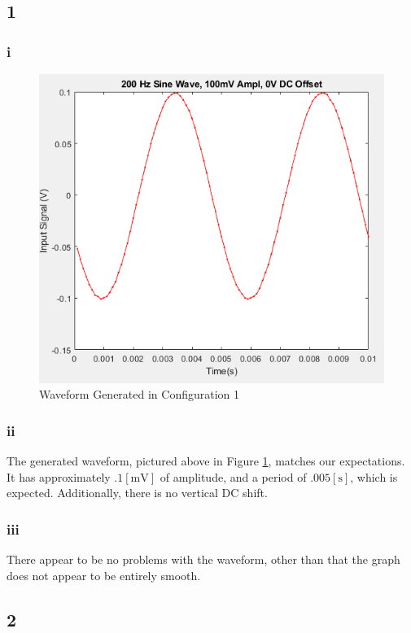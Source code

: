 \documentclass[
	letterpaper, %
	10pt, %
]{CSUniSchoolLabReport}
\begin{document}
  \subsection{1}

  \subsubsection{i} \begin{figure}[h!]
    \centering
    \includegraphics[width=.9\textwidth]{Figures/L8Config1.png}
    \caption{Waveform Generated in Configuration 1}
    \label{fig:3}
  \end{figure}

  \subsubsection{ii} The generated waveform, pictured above in Figure \ref{fig:3}, matches our expectations. It has approximately $.1[\si{\milli\volt}]$ of amplitude, and a period of $.005[\si{\second}]$, which is expected. Additionally, there is no vertical DC shift.

  \subsubsection{iii} There appear to be no problems with the waveform, other than that the graph does not appear to be entirely smooth.

  \subsection{2}
\end{document}
